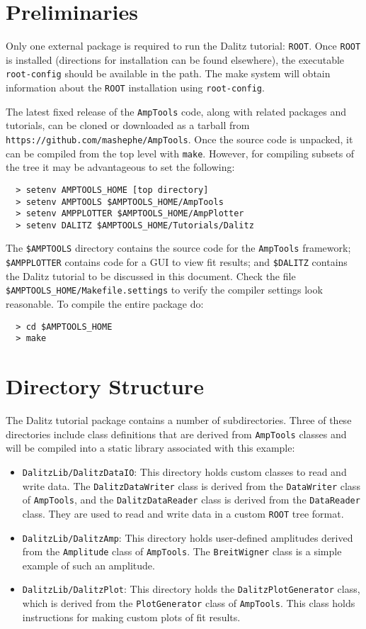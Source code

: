 \documentclass[11pt]{article}
\begin{document}
\section{Preliminaries}

Only one external package is required to run the Dalitz tutorial: {\tt ROOT}. Once {\tt ROOT} is installed (directions for installation can be found elsewhere), the executable {\tt root-config} should be available in the path.  The make system will obtain information about the {\tt ROOT} installation using {\tt root-config}.

The latest fixed release of the {\tt AmpTools} code, along with related packages and tutorials, can be cloned or downloaded as a tarball from {\tt https://github.com/mashephe/AmpTools}.  Once the source code is unpacked, it can be compiled from the top level with {\tt make}.  However, for compiling subsets of the tree it may be advantageous to set the following:
\begin{verbatim}
  > setenv AMPTOOLS_HOME [top directory]
  > setenv AMPTOOLS $AMPTOOLS_HOME/AmpTools
  > setenv AMPPLOTTER $AMPTOOLS_HOME/AmpPlotter
  > setenv DALITZ $AMPTOOLS_HOME/Tutorials/Dalitz
\end{verbatim}

The {\tt \$AMPTOOLS} directory contains the source code for the {\tt AmpTools} framework;  {\tt \$AMPPLOTTER} contains code for a GUI to view fit results; and {\tt \$DALITZ} contains the Dalitz tutorial to be discussed in this document.  Check the file {\tt \$AMPTOOLS\_HOME/Makefile.settings} to verify the compiler settings look reasonable.  To compile the entire package do:
\begin{verbatim}
  > cd $AMPTOOLS_HOME
  > make
\end{verbatim}

\section{Directory Structure}

The Dalitz tutorial package contains a number of subdirectories.  Three of these directories include class definitions that are derived from {\tt AmpTools} classes and will be compiled into a static library associated with this example:
\begin{itemize}
\item {\tt DalitzLib/DalitzDataIO}:  This directory holds custom classes to read and write data.  The {\tt DalitzDataWriter} class is derived from the {\tt DataWriter} class of {\tt AmpTools}, and the {\tt DalitzDataReader} class is derived from the {\tt DataReader} class.  They are used to read and write data in a custom {\tt ROOT} tree format.
\item {\tt DalitzLib/DalitzAmp}: This directory holds user-defined amplitudes derived from the {\tt Amplitude} class of {\tt AmpTools}.  The {\tt BreitWigner} class is a simple example of such an amplitude.
\item {\tt DalitzLib/DalitzPlot}:  This directory holds the {\tt DalitzPlotGenerator} class, which is derived from the {\tt PlotGenerator} class of {\tt AmpTools}.  This class holds instructions for making custom plots of fit results.
\end{itemize}
\end{document}
